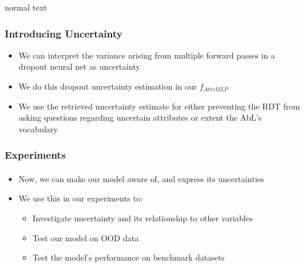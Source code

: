 \documentclass[9pt]{beamer}
\begin{document}
\begin{frame}{normal text}
\frametitle{Introducing Uncertainty}
\begin{itemize}
	\item We can interpret the variance arising from multiple forward passes in a dropout neural net as uncertainty \cite{gal2016dropout}
	\item We do this dropout uncertainty estimation in our $f_{AttrMLP}$
	\item We use the retrieved uncertainty estimate for either preventing the RDT from asking questions regarding uncertain attributes or extent the AbL's vocabulary
\end{itemize}
\end{frame}





\begin{frame}
\frametitle{Experiments}
\framesubtitle{}
\begin{itemize}
	\item Now, we can make our model aware of, and express its uncertainties
	\item We use this in our experiments to:
	\begin{itemize}
		\item Investigate uncertainty and its relationship to other variables
		\item Test our model on OOD data
		\item Test the model's performance on benchmark datasets
	\end{itemize}
\end{itemize}
\end{frame}
\end{document}
